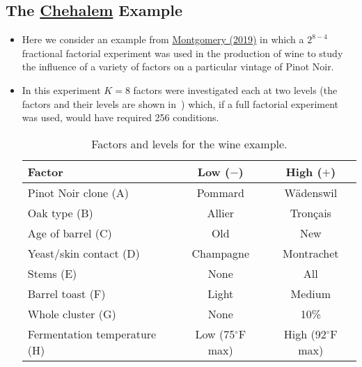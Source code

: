 \subsection{The \href{https://www.chehalemwines.com/}{Chehalem} Example}
\begin{itemize}
      \item Here we consider an example from \href{https://www.wiley.com/en-ca/Design+and+Analysis+of+Experiments C+10th+Edition-p-9781119492443}{Montgomery (2019)} in which a $ 2^{8-4} $ fractional factorial experiment
            was used in the production of wine to study the influence of a variety of factors on a particular vintage
            of Pinot Noir.
      \item In this experiment $K = 8$ factors were investigated each at two levels (the factors and their levels
            are shown in~) which, if a full factorial experiment was used, would have required 256
            conditions.
            \begin{table}[!htbp]
                  \centering
                  \caption{Factors and levels for the wine example.}\label{tab:wine1}
                  \begin{tabular}{lcc}
                        \toprule
                        Factor                       & Low ($ - $)           & High ($ + $)           \\
                        \midrule
                        Pinot Noir clone (A)         & Pommard               & Wädenswil              \\
                        Oak type (B)                 & Allier                & Tronçais               \\
                        Age of barrel (C)            & Old                   & New                    \\
                        Yeast/skin contact (D)       & Champagne             & Montrachet             \\
                        Stems (E)                    & None                  & All                    \\
                        Barrel toast (F)             & Light                 & Medium                 \\
                        Whole cluster (G)            & None                  & 10\%                   \\
                        Fermentation temperature (H) & Low (75$^\circ$F max) & High (92$^\circ$F max) \\

\end{tabular}
\end{table}
\end{itemize}
